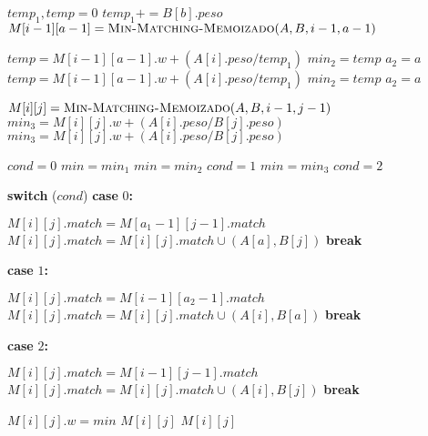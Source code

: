 \documentclass[12pt]{article}
\makeatletter
\newcommand{\algcost}[2]{\strut\hfill\makebox[1.5cm][l]{#1}\makebox[2cm][l]{#2}}
\newcommand{\SWITCH}[1]{\STATE \textbf{switch} (#1)}
\newcommand{\CASE}[1]{\STATE \textbf{case} #1\textbf{:} \begin{ALC@g}}
\newcommand{\ENDCASE}{\end{ALC@g}}
\makeatother
\begin{document}
\begin{algorithmic}[1]
                \STATE $temp_1,temp = 0$
                    \STATE $temp_1 += B[b].peso$
                \ENDFOR
                    \STATE $M[i-1][a-1] = \textsc{Min-Matching-Memoizado}(A,B,i-1,a-1)$                                                     \algcost{$c1$}{$1$}
                    \STATE $temp = M[i-1][a-1].w + (A[i].peso/temp_1)$
                        \STATE $min_2 = temp$
                        \STATE $a_2 = a$
                    \ENDIF
                \ELSE
                    \STATE $temp = M[i-1][a-1].w + (A[i].peso/temp_1)$
                        \STATE $min_2 = temp$
                        \STATE $a_2 = a$
                    \ENDIF
                \ENDIF
            \ENDFOR
            
                \STATE $M[i][j] = \textsc{Min-Matching-Memoizado}(A,B,i-1,j-1)$
                \STATE $min_3 = M[i][j].w + (A[i].peso/B[j].peso)$
            \ELSE
                \STATE $min_3 = M[i][j].w + (A[i].peso/B[j].peso)$
            \ENDIF
            
            \STATE $cond = 0$
            \STATE $min = min_1$
                \STATE $min = min_2$
                \STATE $cond = 1$
                \STATE $min = min_3$
                \STATE $cond = 2$
            \ENDIF
            
            \SWITCH{$cond$}
            \CASE{$0$}                                                     
                \STATE $M[i][j].match = M[a_1-1][j-1].match$
                    \STATE $M[i][j].match = M[i][j].match \cup (A[a],B[j])$
                \ENDFOR
                \STATE \textbf{break}
            \ENDCASE
            \CASE{$1$}                                                     
                \STATE $M[i][j].match = M[i-1][a_2-1].match$
                    \STATE $M[i][j].match = M[i][j].match \cup (A[i],B[a])$
                \ENDFOR
                \STATE \textbf{break}
            \ENDCASE
            \CASE{$2$}                                                     
                \STATE $M[i][j].match = M[i-1][j-1].match$
                \STATE $M[i][j].match = M[i][j].match \cup (A[i],B[j])$
                \STATE \textbf{break}
            \ENDCASE
            \STATE $M[i][j].w = min$
            \RETURN $M[i][j]$
        \ELSE
            \RETURN $M[i][j]$
        \ENDIF
    \ENDIF
\end{algorithmic}
\end{document}
